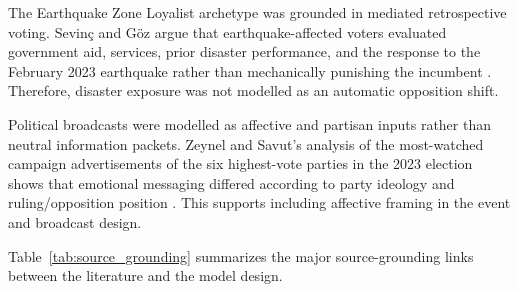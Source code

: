 \documentclass[pdflatex,sn-mathphys-num,iicol]{sn-jnl}
\begin{document}
The Earthquake Zone Loyalist archetype was grounded in mediated retrospective voting. Sevinç and Göz argue that earthquake-affected voters evaluated government aid, services, prior disaster performance, and the response to the February 2023 earthquake rather than mechanically punishing the incumbent \cite{sevinc2024afet}. Therefore, disaster exposure was not modelled as an automatic opposition shift.

Political broadcasts were modelled as affective and partisan inputs rather than neutral information packets. Zeynel and Savut's analysis of the most-watched campaign advertisements of the six highest-vote parties in the 2023 election shows that emotional messaging differed according to party ideology and ruling/opposition position \cite{zeynel2024duygular}. This supports including affective framing in the event and broadcast design.

Table~\ref{tab:source_grounding} summarizes the major source-grounding links between the literature and the model design.
\end{document}
